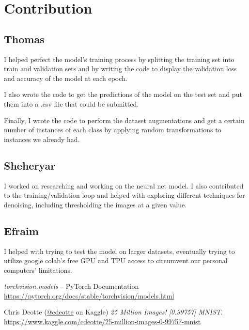 \documentclass[11pt]{article}
\begin{document}
\section{Contribution}

\subsection{Thomas}
I helped perfect the model's training process by splitting the training
set into train and validation sets and by writing the code to display
the validation loss and accuracy of the model at each epoch.

I also wrote the code to get the predictions of the model on the test
set and put them into a .csv file that could be submitted. 

Finally, I wrote the code to perform the dataset augmentations and get a
certain number of instances of each class by applying random
transformations to instances we already had.

\subsection{Sheheryar}
I worked on researching and working on the neural net model. I also
contributed to the training/validation loop and helped with exploring
different techniques for denoising, including thresholding the images at
a given value.

\subsection{Efraim}
I helped with trying to test the model on larger datasets, eventually
trying to utilize google colab's free GPU and TPU access to circumvent
our personal computers' limitations.    

\begin{thebibliography}{2}
  \textit{torchvision.models} -- PyTorch Documentation
  \\\url{https://pytorch.org/docs/stable/torchvision/models.html}

  Chris Deotte (\href{https://www.kaggle.com/cdeotte}{@cdeotte} on
  Kaggle)
  \textit{25 Million Images! [0.99757] MNIST}.
  \\\url{https://www.kaggle.com/cdeotte/25-million-images-0-99757-mnist}
\end{thebibliography}
\end{document}
